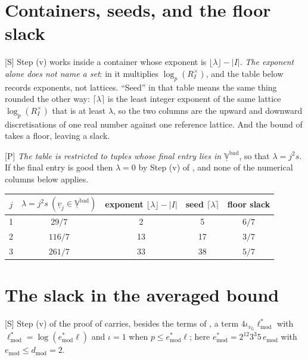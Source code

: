 \documentclass[11pt]{article}
\theoremstyle{plain}
\theoremstyle{definition}
\newcommand{\Vbad}{\underline{\mathbb{V}}^{\mathrm{bad}}}
\begin{document}
\section{Containers, seeds, and the floor slack}\label{s:container}

\textup{[S]} Step (v) works inside a container whose exponent is
$\lfloor\lambda\rfloor-|I|$.  \emph{The exponent alone does not name a set}: in
\cite[Prop.~1.4(iii)]{IUT4} it multiplies $\log_p(R_I^{\times})$, and the table below
records exponents, not lattices.  ``Seed'' in that table means the same thing rounded
the other way: $\lceil\lambda\rceil$ is the least integer exponent of the same lattice
$\log_p(R_I^{\times})$ that is at least $\lambda$, so the two columns are the upward
and downward discretisations of one real number against one reference lattice.  And
the bound of \cite[Prop.~1.4(iii)]{IUT4} takes a floor, leaving a slack.

\textup{[P]} \emph{The table is restricted to tuples whose final entry lies in
$\Vbad$}, so that $\lambda=j^2s$.  If the final entry is good then $\lambda=0$ by Step
(v) of \cite[Thm.~1.10]{IUT4}, and none of the numerical columns below applies.

\begin{center}
\begin{tabular}{ccccc}
\toprule
$j$ & $\lambda=j^2s\ (\underline v_j\in\Vbad)$ & exponent $\lfloor\lambda\rfloor-|I|$ & seed $\lceil\lambda\rceil$ & floor slack\\
\midrule
1 & $29/7$  & 2  & 5  & $6/7$\\
2 & $116/7$ & 13 & 17 & $3/7$\\
3 & $261/7$ & 33 & 38 & $5/7$\\
\bottomrule
\end{tabular}
\end{center}

\section{The slack in the averaged bound}\label{s:slack}

\textup{[S]} Step (v) of the proof of \cite[Thm.~1.10]{IUT4} carries, besides the
terms of \cite[Prop.~1.4(iii)]{IUT4}, a term $4\iota_{v_{\mathbb Q}}\ell^{*}_{\mathrm{mod}}$
with $\ell^{*}_{\mathrm{mod}}=\log(e^{*}_{\mathrm{mod}}\ell)$ and $\iota=1$ when
$p\le e^{*}_{\mathrm{mod}}\ell$; here
$e^{*}_{\mathrm{mod}}=2^{12}3^{3}5\,e_{\mathrm{mod}}$ with
$e_{\mathrm{mod}}\le d_{\mathrm{mod}}=2$.
\end{document}
